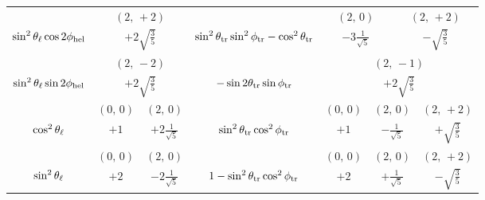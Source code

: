 \begin{table}[p]
\begin{tabular}{| c | c c c c c c || c | c c c c c c |}
                                                 &  \multicolumn{6}{c||}{$(2,\,+2)$}            &
                                                 &  \multicolumn{3}{c|}{$(2,\,0)$}
                                                 &  \multicolumn{3}{c|}{$(2,\,+2)$}             \\
    \cline{2-7}\cline{9-14}
    $\sin^2\theta_\ell \cos2\phi_\text{hel}$                 &  \multicolumn{6}{c||}{$+2\sqrt{\frac{3}{5}}$} &
    $\sin^2\theta_\text{tr}\sin^2\phi_\text{tr}-\cos^2\theta_\text{tr}$  &  \multicolumn{3}{c|}{$-3\frac{1}{\sqrt{5}}$}
                                                 &  \multicolumn{3}{c|}{$-\sqrt{\frac{3}{5}}$}   \\
    \hline

                                  &  \multicolumn{6}{c||}{$(2,\,-2)$}             &
                                  &  \multicolumn{6}{c|}{$(2,\,-1)$}              \\
    \cline{2-7}\cline{9-14}
    $\sin^2\theta_\ell \sin2\phi_\text{hel}$  &  \multicolumn{6}{c||}{$+2\sqrt{\frac{3}{5}}$}  &
    $-\sin2\theta_\text{tr} \sin\phi_\text{tr}$   &  \multicolumn{6}{c|}{$+2\sqrt{\frac{3}{5}}$}   \\
    \hline

                                   &  \multicolumn{3}{c|}{$(0,\,0)$}
                                   &  \multicolumn{3}{c||}{$(2,\,0)$}           &
                                   &  \multicolumn{2}{c|}{$(0,\,0)$}
                                   &  \multicolumn{2}{c|}{$(2,\,0)$}
                                   &  \multicolumn{2}{c|}{$(2,\,+2)$}              \\
    \cline{2-7}\cline{9-14}
    $\cos^2\theta_\ell$                &  \multicolumn{3}{c|}{$+1$}
                                   &  \multicolumn{3}{c||}{$+2\frac{1}{\sqrt{5}}$}  &
    $\sin^2\theta_\text{tr} \cos^2\phi_\text{tr}$  &  \multicolumn{2}{c|}{$+1$}
                                   &  \multicolumn{2}{c|}{$-\frac{1}{\sqrt{5}}$}
                                   &  \multicolumn{2}{c|}{$+\sqrt{\frac{3}{5}}$}    \\
    \hline

                                     &  \multicolumn{3}{c|}{$(0,\,0)$}
                                     &  \multicolumn{3}{c||}{$(2,\,0)$}           &
                                     &  \multicolumn{2}{c|}{$(0,\,0)$}
                                     &  \multicolumn{2}{c|}{$(2,\,0)$}
                                     &  \multicolumn{2}{c|}{$(2,\,+2)$}              \\
    \cline{2-7}\cline{9-14}
    $\sin^2\theta_\ell$                  &  \multicolumn{3}{c|}{$+2$}
                                     &  \multicolumn{3}{c||}{$-2\frac{1}{\sqrt{5}}$}  &
    $1-\sin^2\theta_\text{tr} \cos^2\phi_\text{tr}$  &  \multicolumn{2}{c|}{$+2$}
                                     &  \multicolumn{2}{c|}{$+\frac{1}{\sqrt{5}}$}
                                     &  \multicolumn{2}{c|}{$-\sqrt{\frac{3}{5}}$}    \\
    \hline


\end{tabular}
\end{table}
